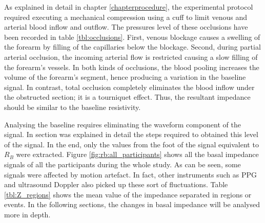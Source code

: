 
As explained in detail in chapter \ref{chapterprocedure}, the experimental protocol required executing a mechanical compression using a cuff to limit venous and arterial blood inflow and outflow. The pressures level of these occlusions have been recorded in table \ref{tbl:occlusions}. First, venous blockage causes a swelling of the forearm by filling of the capillaries below the blockage. Second, during partial arterial occlusion, the incoming arterial flow is restricted causing a slow filling of the forearm's vessels. In both kinds of occlusions, the blood pooling increases the volume of the forearm's segment, hence producing a variation in the baseline signal. In contrast, total occlusion completely eliminates the blood inflow under the obstructed section; it is a tourniquet effect. Thus, the resultant impedance should be similar to the baseline resistivity.

Analysing the baseline requires eliminating the waveform component of the signal. In section  was explained in detail the steps required to obtained this level of the signal. In the end, only the values from the foot of the signal equivalent to $R_B$ were extracted. Figure \ref{fig:rb:all_participants} shows all the basal impedance signals of all the participants during the whole study. As can be seen, some signals were affected by motion artefact. In fact, other instruments such as PPG and ultrasound Doppler also picked up these sort of fluctuations. Table \ref{tbl:Z_regions} shows the mean value of the impedance separated in regions or events. In the following sections, the changes in basal impedance will be analysed more in depth. 

